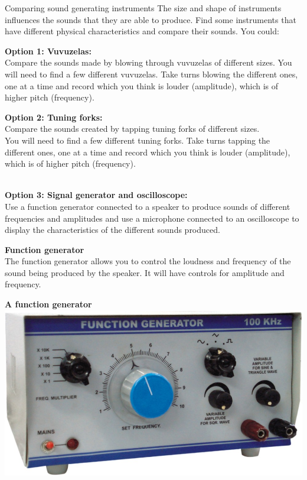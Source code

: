 \begin{activity}{Comparing sound generating instruments}
The size and shape of instruments influences the sounds that they are able to produce. Find some instruments that have different physical characteristics and compare their sounds. You could:\par\vspace{1em}
\begin{minipage}{.45\textwidth}
\textbf{Option 1: Vuvuzelas:}\\
Compare the sounds made by blowing through vuvuzelas of different sizes. You will need to find a few different vuvuzelas. Take turns blowing the different ones, one at a time and record which you think is louder (amplitude), which is of higher pitch (frequency).
\end{minipage}\hspace{.1\textwidth}
\begin{minipage}{.45\textwidth}
\textbf{Option 2: Tuning forks:}\\
Compare the sounds created by tapping tuning forks of different sizes.\\
You will need to find a few different tuning forks. Take turns tapping the different ones, one at a time and record which you think is louder (amplitude), which is of higher pitch (frequency).
\end{minipage}\\
\vspace{1em}
\noindent
\textbf{Option 3: Signal generator and oscilloscope:}\\
Use a function generator connected to a speaker to produce sounds of different frequencies and amplitudes and use a microphone connected to an oscilloscope to display the characteristics of the different sounds produced. \\
\begin{minipage}{.5\textwidth}
\textbf{Function generator}\\
The function generator allows you to control the loudness and frequency of the sound being produced by the speaker. It will have controls for amplitude and frequency.\\
\end{minipage}
\begin{minipage}{.5\textwidth}
\begin{center}
\textbf{A function generator}\\
\includegraphics[width=.8\textwidth]{photos/function_generator.jpg}\\

\end{center}
\end{minipage}
\end{activity}
